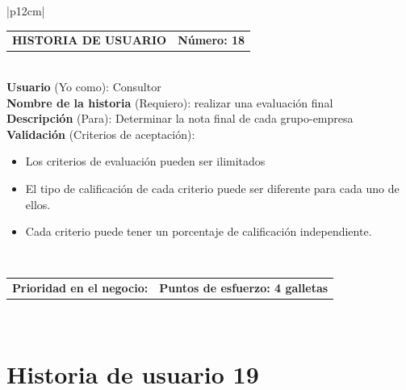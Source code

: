 \documentclass[11pt,letterpaper]{report}
\begin{document}
	\begin{center}	
		\begin{tabular}{|p{12cm}|}
			\hline
			\begin{tabular}{c|c}
				\textbf{HISTORIA DE USUARIO} & \textbf{Número: 18} \\
			\end{tabular} \\ \hline
			\textbf{Usuario} (Yo como): Consultor \\ \hline
			\textbf{Nombre de la historia} (Requiero): realizar una evaluación final \\ \hline
			\textbf{Descripción} (Para): Determinar la nota final de cada grupo-empresa \\ \hline
			\textbf{Validación} (Criterios de aceptación): \\
			\begin{minipage}{12cm}
				\begin{itemize}
					\item Los criterios de evaluación pueden ser ilimitados
					\item El tipo de calificación de cada criterio puede ser diferente para cada uno de ellos.
					\item Cada criterio puede tener un porcentaje de calificación independiente.
				\end{itemize}
			\end{minipage} \\ \hline
			\begin{tabular}{p{6cm}|c}
				\textbf{Prioridad en el negocio: } & \textbf{Puntos de esfuerzo: 4 galletas} \\
			\end{tabular} \\ \hline
		\end{tabular}
	\end{center}
	
	\section{Historia de usuario 19}	
	
\end{document}
